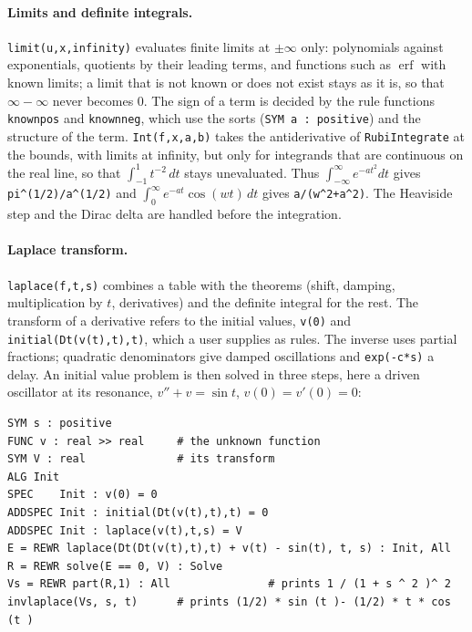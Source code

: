 \documentclass[11pt,a4paper]{article}
\begin{document}
\paragraph{Limits and definite integrals.} \texttt{limit(u,x,infinity)}
evaluates finite limits at $\pm\infty$ only: polynomials against
exponentials, quotients by their leading terms, and functions such as
$\operatorname{erf}$ with known limits; a limit that is not known or does
not exist stays as it is, so that $\infty-\infty$ never becomes 0. The
sign of a term is decided by the rule functions \texttt{knownpos} and
\texttt{knownneg}, which use the sorts (\texttt{SYM a : positive}) and
the structure of the term. \texttt{Int(f,x,a,b)} takes the antiderivative of
\texttt{RubiIntegrate} at the bounds, with limits at infinity, but only for
integrands that are continuous on the real line, so that
$\int_{-1}^{1}t^{-2}\,dt$ stays unevaluated. Thus
$\int_{-\infty}^{\infty}e^{-at^2}dt$ gives \texttt{pi\^{}(1/2)/a\^{}(1/2)}
and $\int_0^\infty e^{-at}\cos(wt)\,dt$ gives \texttt{a/(w\^{}2+a\^{}2)}.
The Heaviside step and the Dirac delta are handled before the integration.

\paragraph{Laplace transform.} \texttt{laplace(f,t,s)} combines a table
with the theorems (shift, damping, multiplication by $t$, derivatives) and
the definite integral for the rest. The transform of a derivative refers to
the initial values, \texttt{v(0)} and \texttt{initial(Dt(v(t),t),t)}, which
a user supplies as rules. The inverse uses partial fractions; quadratic
denominators give damped oscillations and \texttt{exp(-c*s)} a delay. An
initial value problem is then solved in three steps, here a driven
oscillator at its resonance, $v''+v=\sin t$, $v(0)=v'(0)=0$:

\begin{lstlisting}
SYM s : positive
FUNC v : real >> real     # the unknown function
SYM V : real              # its transform
ALG Init
SPEC    Init : v(0) = 0
ADDSPEC Init : initial(Dt(v(t),t),t) = 0
ADDSPEC Init : laplace(v(t),t,s) = V
E = REWR laplace(Dt(Dt(v(t),t),t) + v(t) - sin(t), t, s) : Init, All
R = REWR solve(E == 0, V) : Solve
Vs = REWR part(R,1) : All               # prints 1 / (1 + s ^ 2 )^ 2
invlaplace(Vs, s, t)      # prints (1/2) * sin (t )- (1/2) * t * cos (t )
\end{lstlisting}
\end{document}
